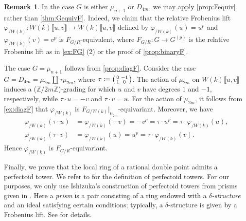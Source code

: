 \documentclass[uplatex,11pt,a4paper]{amsart} %
\numberwithin{equation}{section}
\numberwithin{figure}{section}
\numberwithin{table}{section}
\theoremstyle{plain}
\theoremstyle{definition}
\newtheorem{remark}[theorem]{Remark}
\newcommand{\Z}{\mathbb{Z}}
\DeclareMathOperator{\SL}{SL}
\newenvironment{psmatrix}{\left(\begin{smallmatrix}}{\end{smallmatrix}\right)}
\begin{document}
\begin{remark}
In the case $G$ is either $\mu_{n+1}$ or $D_{4m}$, we may apply \cref{prop:Fequiv} rather than \cref{thm:GequivF}. Indeed, we claim that the relative Frobenius lift $\varphi_{/W(k)} \colon W(k)\llbracket u,v\rrbracket \to W(k)\llbracket u,v\rrbracket$ defined by $\varphi_{/W(k)}(u)=u^p$ and $\varphi_{/W(k)}(v)=v^p$ is $F_{G/R}$-equivalent, where $F_{G/R}\colon G\to G^{(p)}$ is the relative Frobenius lift as in \cref{ex:FG} (2) or the proof of \cref{prop:binaryF}.

The case $G=\mu_{n+1}$ follows from \cref{prop:diagF}.
Consider the case $G=D_{4m}=\mu_{2m}\coprod\tau\mu_{2m}$, where $\tau\coloneqq\begin{psmatrix}0 & -1 \\ 1 & 0 \end{psmatrix}$. The action of $\mu_{2m}$ on $W(k)\llbracket u,v\rrbracket$ induces a ($\Z/2m\Z$)-grading for which $u$ and $v$ have degrees $1$ and $-1$, respectively, while $\tau\cdot u=-v$ and $\tau\cdot v=u$.
For the action of $\mu_{2m}$, it follows from \cref{ex:diagF} that $\varphi_{/W(k)}$ is $F_{G/W(k)}|_{\mu_{2m}}$-equivariant.
Moreover, we have
\begin{align*}
\varphi_{/W(k)}(\tau\cdot u) &=\varphi_{/W(k)}(-v)=-v^p=\tau\cdot u^p=\tau\cdot \varphi_{/W(k)}(u), \\
\varphi_{/W(k)}(\tau\cdot v) &=\varphi_{/W(k)}(u)=u^p=\tau\cdot\varphi_{/W(k)}(v).
\end{align*}
Hence $\varphi_{/W(k)}$ is $F_{G/R}$-equivariant.
\end{remark}

Finally, we prove that the local ring of a rational double point admits a perfectoid tower. We refer to \cite[Definition 3.21]{INS25} for the definition of perfectoid towers. For our purposes, we only use Ishizuka's construction of perfectoid towers from prisms given in \cite[Theorem 4.5]{Ish26}. Here a \emph{prism} is a pair consisting of a ring endowed with a \emph{$\delta$-structure} and an ideal satisfying certain conditions; typically, a $\delta$-structure is given by a Frobenius lift. See \cite[\S\S2 and 3]{BS22} for details. 
\end{document}

